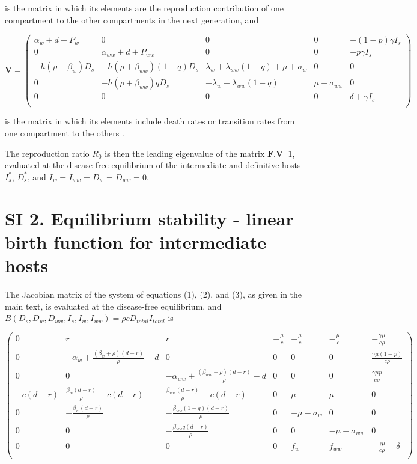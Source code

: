 \documentclass[11pt]{article}
\begin{document}
is the matrix in which its elements are the reproduction contribution of one compartment to the other compartments in the next generation, and

\[
\mathbf{V} = 
\begin{pmatrix}
\alpha_w + d + P_w  & 0 & 0 & 0 & - (1 - p) \gamma  I_s\\
 0 & \alpha_{ww} + d + P_{ww} & 0 & 0 & - p \gamma I_s \\
- h(\rho + \beta_w) D_s & - h(\rho + \beta_{ww})  (1 - q) D_s & \lambda_w +  \lambda_{ww} (1-q) + \mu + \sigma_w & 0 & 0 \\
 0 & -h (\rho + \beta_{ww}) q D_s  & -\lambda_w -  \lambda_{ww} (1 - q) & \mu + \sigma_{ww} & 0 \\
 0 & 0 & 0 & 0 & \delta + \gamma I_s \\
\end{pmatrix}
\]

is the matrix in which its elements include death rates or transition rates from one compartment to the others \citep{Diekmann1990, Diekmann2009, hurford:JRSI:2010}. 

The reproduction ratio $R_0$ is then the leading eigenvalue of the matrix $\mathbf{F}.\mathbf{V}^-1$, evaluated at the disease-free equilibrium of the intermediate and definitive hosts $I_s^*$, $D_s^*$, and $I_w = I_{ww} = D_w = D_{ww} = 0$.

\section*{SI 2. Equilibrium stability - linear birth function for intermediate hosts}

The Jacobian matrix of the system of equations (1), (2), and (3), as given in the main text, is evaluated at the disease-free equilibrium, and $B(D_s, D_w, D_{ww}, I_s, I_w, I_{ww}) = \rho c D_{total} I_{total}$ is

\[
\begin{pmatrix}
	0 & r & r & -\frac{\mu}{c} & -\frac{\mu }{c} & -\frac{\mu }{c} & -\frac{\gamma  \mu }{c \rho } \\
	0 & -\alpha_w + \frac{(\beta_w + \rho ) (d-r)}{\rho } - d & 0 & 0 & 0 & 0 & \frac{\gamma  \mu  (1-p)}{c \rho } \\
	0 & 0 & -\alpha_{ww} + \frac{(\beta_{ww} + \rho ) (d-r)}{\rho } - d & 0 & 0 & 0 & \frac{\gamma  \mu  p}{c \rho } \\
	-c (d-r) & \frac{\beta_w (d-r)}{\rho } - c (d-r) & \frac{\beta_{ww} (d-r)}{\rho }-c (d-r) & 0 & \mu  & \mu  & 0 \\
	0 & -\frac{\beta_w (d-r)}{\rho } & -\frac{ \beta_{ww} (1-q) (d-r)}{\rho } & 0 & -\mu - \sigma_w & 0 & 0 \\
	0 & 0 & -\frac{\beta_{ww} q (d-r)}{\rho } & 0 & 0 & -\mu - \sigma_{ww} & 0 \\
	0 & 0 & 0 & 0 & f_w & f_{ww} & -\frac{\gamma  \mu }{c \rho } - \delta  \\
\end{pmatrix}
\]
\end{document}
